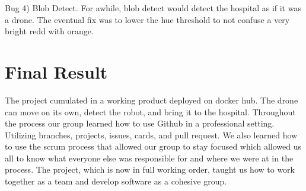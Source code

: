 Bug 4) Blob Detect. For awhile, blob detect would detect the hospital as if it was a drone. The eventual fix was to lower the hue threshold to not confuse a very bright redd with orange.\hypertarget{overview_final_result}{}\section{Final Result}\label{overview_final_result}
The project cumulated in a working product deployed on docker hub. The drone can move on its own, detect the robot, and bring it to the hospital. Throughout the process our group learned how to use Github in a professional setting. Utilizing branches, projects, issues, cards, and pull request. We also learned how to use the scrum process that allowed our group to stay focused which allowed us all to know what everyone else was responsible for and where we were at in the process. The project, which is now in full working order, taught us how to work together as a team and develop software as a cohesive group. 